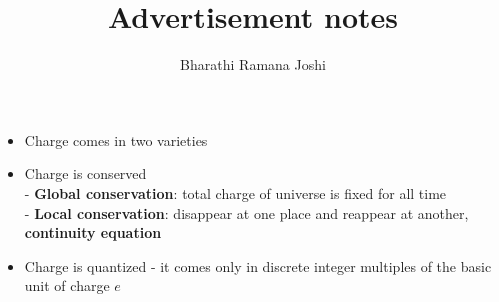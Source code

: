 \documentclass[titlepage, 12pt]{article}
\begin{document}
\title{Advertisement notes}

\author{Bharathi Ramana Joshi}

\maketitle

\newpage

\begin{itemize}
    \item Charge comes in two varieties
    \item Charge is conserved\\
        - \textbf{Global conservation}: total charge of universe is fixed for
        all time\\
        - \textbf{Local conservation}: disappear at one place and reappear at
        another, \textbf{continuity equation}\\
    \item Charge is quantized - it comes only in discrete integer multiples of
        the basic unit of charge $e$
\end{itemize}
\end{document}
